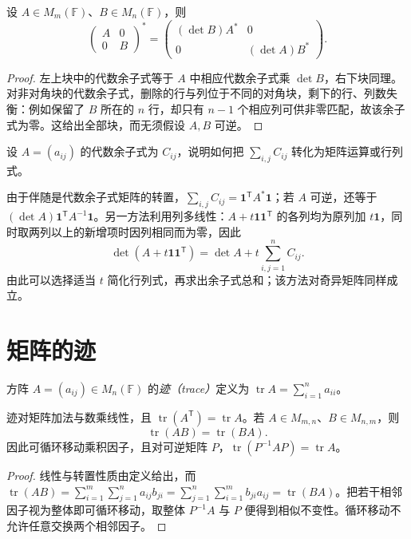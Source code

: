 \begin{proposition}
\label{prop:matrix-block-adjugate}
设 $A\in M_m(\mathbb F)$、$B\in M_n(\mathbb F)$，则
\begin{equation}
 \begin{pmatrix}A&0\\0&B\end{pmatrix}^*
 =\begin{pmatrix}(\det B)A^*&0\\0&(\det A)B^*\end{pmatrix}.
 \label{eq:matrix-block-adjugate}
\end{equation}
\end{proposition}
\begin{proof}
左上块中的代数余子式等于 $A$ 中相应代数余子式乘 $\det B$，右下块同理。对非对角块的代数余子式，删除的行与列位于不同的对角块，剩下的行、列数失衡：例如保留了 $B$ 所在的 $n$ 行，却只有 $n-1$ 个相应列可供非零匹配，故该余子式为零。这给出全部块，而无须假设 $A,B$ 可逆。
\end{proof}

\begin{example}
\label{ex:matrix-cofactor-sum}
设 $A=(a_{ij})$ 的代数余子式为 $C_{ij}$，说明如何把 $\sum_{i,j}C_{ij}$ 转化为矩阵运算或行列式。
\end{example}
\begin{solve}
由于伴随是代数余子式矩阵的转置，$\sum_{i,j}C_{ij}=\mathbf1^{\mathsf T}A^*\mathbf1$；若 $A$ 可逆，还等于 $(\det A)\mathbf1^{\mathsf T}A^{-1}\mathbf1$。另一方法利用列多线性：$A+t\mathbf1\mathbf1^{\mathsf T}$ 的各列均为原列加 $t\mathbf1$，同时取两列以上的新增项时因列相同而为零，因此
\[
 \det(A+t\mathbf1\mathbf1^{\mathsf T})
 =\det A+t\sum_{i,j=1}^n C_{ij}.
\]
由此可以选择适当 $t$ 简化行列式，再求出余子式总和；该方法对奇异矩阵同样成立。
\end{solve}

\section{矩阵的迹}
\label{sec:matrix-trace}

\begin{definition}
方阵 $A=(a_{ij})\in M_n(\mathbb F)$ 的\emph{迹（trace）}定义为 $\operatorname{tr}A=\sum_{i=1}^n a_{ii}$。
\end{definition}

\begin{proposition}
\label{prop:matrix-trace-rules}
迹对矩阵加法与数乘线性，且 $\operatorname{tr}(A^{\mathsf T})=\operatorname{tr}A$。若 $A\in M_{m,n}$、$B\in M_{n,m}$，则
\begin{equation}
 \operatorname{tr}(AB)=\operatorname{tr}(BA).
 \label{eq:matrix-trace-cyclic}
\end{equation}
因此可循环移动乘积因子，且对可逆矩阵 $P$，$\operatorname{tr}(P^{-1}AP)=\operatorname{tr}A$。
\end{proposition}
\begin{proof}
线性与转置性质由定义给出，而 $\operatorname{tr}(AB)=\sum_{i=1}^m\sum_{j=1}^n a_{ij}b_{ji}=\sum_{j=1}^n\sum_{i=1}^m b_{ji}a_{ij}=\operatorname{tr}(BA)$。把若干相邻因子视为整体即可循环移动，取整体 $P^{-1}A$ 与 $P$ 便得到相似不变性。循环移动不允许任意交换两个相邻因子。
\end{proof}

